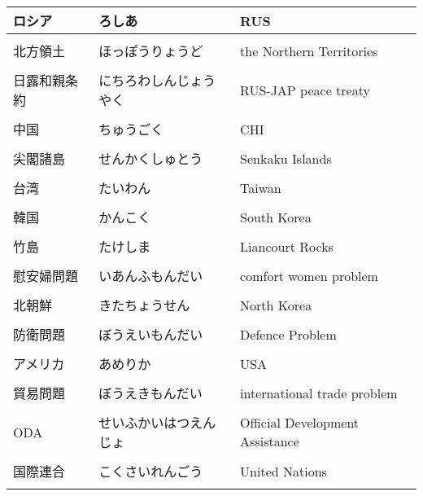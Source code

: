\documentclass{article}
\begin{document}
\begin{tabular}{  l | l | p{7.5cm} }
 ロシア					& ろしあ				& RUS	\\ \hline \\[-1em]
 北方領土					& ほっぽうりょうど 		& the Northern Territories\\ \hline \\[-1em]
 日露和親条約				& にちろわしんじょうやく		& RUS-JAP peace treaty\\ \hline \\[-1em]
 中国					& ちゅうごく				& CHI \\ \hline \\[-1em]
 尖閣諸島					& せんかくしゅとう			& Senkaku Islands　\\ \hline \\[-1em]
 台湾					& たいわん				& Taiwan \\ \hline \\[-1em]
 韓国					& かんこく 				& South Korea\\ \hline \\[-1em]
 竹島					& たけしま				& Liancourt Rocks \\ \hline \\[-1em]
 慰安婦問題				& いあんふもんだい		& comfort women problem\\ \hline \\[-1em]
 北朝鮮					& きたちょうせん			& North Korea \\ \hline \\[-1em]
 防衛問題					& ぼうえいもんだい		& Defence Problem \\ \hline \\[-1em]
 アメリカ					& あめりか				& USA	 \\ \hline \\[-1em]
 貿易問題					& ぼうえきもんだい		& international trade problem\\ \hline \\[-1em]
 ODA				& せいふかいはつえんじょ  &Official Development Assistance \\ \hline \\[-1em]
 国際連合					& こくさいれんごう 		& United Nations \\ \hline \\[-1em]
    \end{tabular}
\end{document}
